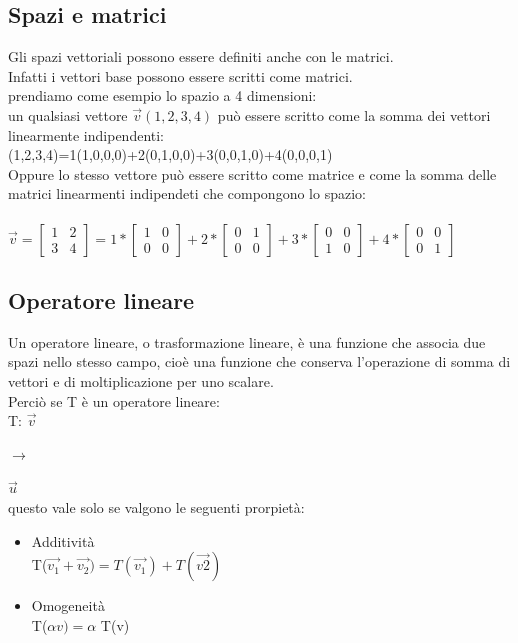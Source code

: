 \documentclass[a4paper]{article}
\begin{document}
\subsection{Spazi e matrici}
Gli spazi vettoriali possono essere definiti anche con le matrici.
\\ Infatti i vettori base possono essere scritti come matrici.
\\ prendiamo come esempio lo spazio a 4 dimensioni:
\\ un qualsiasi vettore $\vec{v}(1,2,3,4)$ può essere scritto come la somma dei vettori linearmente indipendenti:
\\ (1,2,3,4)=1(1,0,0,0)+2(0,1,0,0)+3(0,0,1,0)+4(0,0,0,1)
\\ Oppure lo stesso vettore può essere scritto come matrice e come la somma delle matrici linearmenti indipendeti che compongono lo spazio:
\\
\\ $\vec{v}
=\left[\begin{matrix}1& 2\\ 3 & 4\end{matrix}\right]
= 1*\left[\begin{matrix}1& 0 \\ 0 & 0\end{matrix}\right]
+ 2*\left[\begin{matrix}0 & 1 \\ 0 & 0\end{matrix}\right]
+ 3*\left[\begin{matrix}0 & 0 \\ 1 & 0\end{matrix}\right]
+ 4*\left[\begin{matrix}0 & 0 \\ 0 & 1\end{matrix}\right]
$
 	
\subsection{Operatore lineare}
Un operatore lineare, o trasformazione lineare, è una funzione che associa due spazi nello stesso campo, cioè una funzione che conserva l'operazione di somma di vettori e di moltiplicazione per uno scalare.
\\ Perciò se T è un operatore lineare:
\\ T: $\vec{v} 
$
\begin{large} $\rightarrow$ \end{large} 
$ \vec{u}
$
\\ questo vale solo se valgono le seguenti prorpietà:
\begin{itemize}
\item Additività
\\ T($\vec{v_{1}} + \vec{v_{2}})= T(\vec{v_{1}})+T(\vec{v{2}}) 
$
\item Omogeneità
\\ T($\alpha v)=\alpha $ T(v)
\end{itemize}
\end{document}
